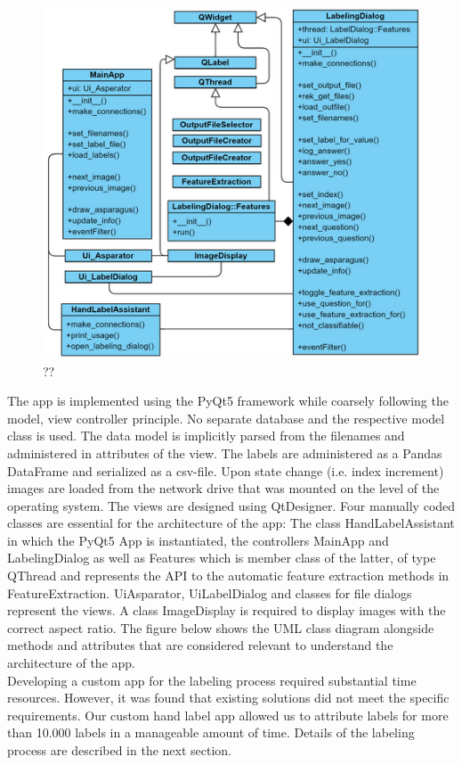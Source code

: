 \begin{figure}[h]
	\centering
	\includegraphics[scale=0.6]{Figures/chapter03/label_app_tree}
	\decoRule
	\caption[??]{??}
	\label{fig:LabelAppTree}
\end{figure}

The app is implemented using the PyQt5 framework while coarsely following the model, view controller principle. No separate database and the respective model class is used. The data model is implicitly parsed from the filenames and administered in attributes of the view. The labels are administered as a Pandas DataFrame and serialized as a csv-file. Upon state change (i.e. index increment) images are loaded from the network drive that was mounted on the level of the operating system. The views are designed using QtDesigner. Four manually coded classes are essential for the architecture of the app: The class HandLabelAssistant in which the PyQt5 App is instantiated, the controllers MainApp and LabelingDialog as well as Features which is member class of the latter, of type QThread and represents the API to the automatic feature extraction methods in FeatureExtraction. Ui\textunderscore Asparator, UiLabelDialog and classes for file dialogs represent the views. A class ImageDisplay is required to display images with the correct aspect ratio. The figure below shows the UML class diagram alongside methods and attributes that are considered relevant to understand the architecture of the app. \\
Developing a custom app for the labeling process required substantial time resources. However, it was found that existing solutions did not meet the specific requirements. Our custom hand label app allowed us to attribute labels for more than 10.000 labels in a manageable amount of time. Details of the labeling process are described in the next section.

